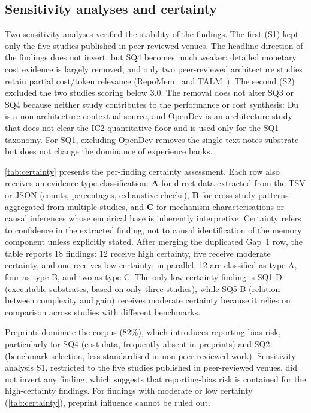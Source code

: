\FloatBarrier
\subsection{Sensitivity analyses and certainty}
\label{sec:sensitivity}

Two sensitivity analyses verified the stability of the findings.
The first (S1) kept only the five studies published in peer-reviewed
venues.
The headline direction of the findings does not invert, but SQ4 becomes
much weaker:
detailed monetary cost evidence is largely removed, and only two
peer-reviewed architecture studies retain partial cost/token relevance
(RepoMem~\citep{wang2026improving} and
TALM~\citep{shen2025talm}).
The second (S2) excluded the two studies scoring below 3.0.
The removal does not alter SQ3 or SQ4 because neither study contributes
to the performance or cost synthesis: Du is a non-architecture
contextual source, and OpenDev is an architecture study that does not
clear the IC2 quantitative floor and is used only for the SQ1
taxonomy.
For SQ1, excluding OpenDev removes the single text-notes substrate
but does not change the dominance of experience banks.

\autoref{tab:certainty} presents the per-finding certainty assessment.
Each row also receives an evidence-type classification:
\textbf{A} for direct data extracted from the TSV or JSON (counts,
percentages, exhaustive checks), \textbf{B} for cross-study patterns
aggregated from multiple studies, and \textbf{C} for mechanism
characterisations or causal inferences whose empirical base is
inherently interpretive.
Certainty refers to confidence in the extracted finding, not to causal
identification of the memory component unless explicitly stated.
After merging the duplicated Gap~1 row, the table reports 18 findings:
12 receive high certainty, five receive moderate certainty, and one
receives low certainty;
in parallel, 12 are classified as type A, four as type B, and two as
type C.
The only low-certainty finding is SQ1-D (executable substrates, based
on only three studies), while SQ5-B (relation between complexity and
gain) receives moderate certainty because it relies on comparison
across studies with different benchmarks.

\FloatBarrier

Preprints dominate the corpus (82\%), which introduces reporting-bias
risk, particularly for SQ4 (cost data, frequently absent in preprints)
and SQ2 (benchmark selection, less standardised in non-peer-reviewed
work).
Sensitivity analysis S1, restricted to the five studies published in
peer-reviewed venues, did not invert any finding, which suggests that
reporting-bias risk is contained for the high-certainty findings.
For findings with moderate or low certainty (\autoref{tab:certainty}),
preprint influence cannot be ruled out.


